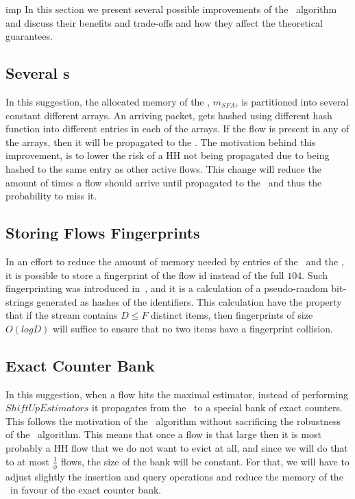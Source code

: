 \begin{maybeappendix}{imp}
In this section we  present several possible improvements of the \cs\ algorithm and discuss their benefits and trade-offs and how they affect the theoretical guarantees.
\subsection{Several \sfa s}
In this suggestion, the allocated memory of the \sfa, $m_{SFA}$, is partitioned into several constant different arrays. An arriving packet, gets hashed using different hash function into different entries in each of the arrays. If the flow is present in any of the arrays, then it will be propagated to the \cs. The motivation behind this improvement, is to lower the risk of a HH not being propagated due to being hashed to the same entry as other active flows. This change will reduce the amount of times a flow should arrive until propagated to the \cs\ and thus the probability to miss it.
\subsection{Storing Flows Fingerprints}
In an effort to reduce the amount of memory needed by entries of the \cs\ and the \sfa, it is possible to store a fingerprint of the flow id instead of the full $104$. Such fingerprinting was introduced in~\cite{RanFP}, and it is a calculation of a pseudo-random bit-strings generated as hashes of the identifiers. This calculation have the property that if the stream contains $D\leq F$ distinct items, then fingerprints of size $O(log D)$ will suffice to ensure that no two items have a fingerprint collision. 
\subsection{Exact Counter Bank}
In this suggestion, when a flow hits the maximal estimator, instead of performing $ShiftUpEstimators$ it propagates from the \cs\ to a special bank of exact counters. This follows the motivation of the \eb\ algorithm without sacrificing the robustness of the \cs\ algorithm. This means that once a flow is that large then it is most probably a HH flow that we do not want to evict at all, and since we will do that to at most $\frac{1}{\phi}$ flows, the size of the bank will be constant. For that, we will have to adjust slightly the insertion and query operations and reduce the memory of the \cs\ in favour of the exact counter bank.
\end{maybeappendix}